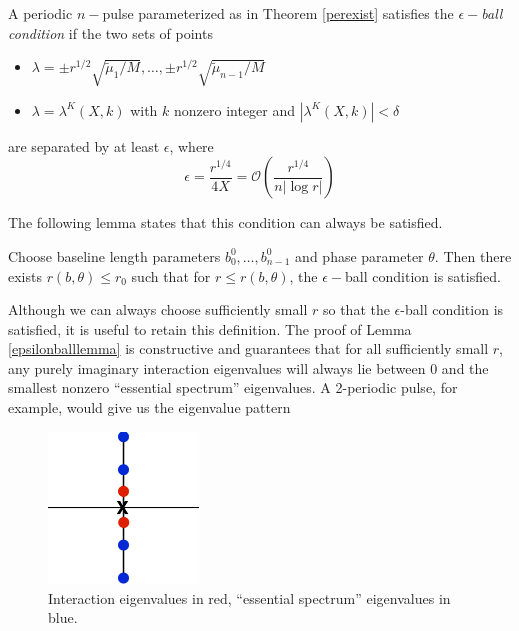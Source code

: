 \documentclass[thesis.tex]{subfiles}
\begin{document}
\begin{definition}\label{epsilonballs}
A periodic $n-$pulse parameterized as in Theorem \ref{perexist} satisfies the \emph{$\epsilon-$ball condition} if the two sets of points 
\begin{itemize}
\item $\lambda = \pm r^{1/2} \sqrt{\tilde{\mu}_1/M}, \dots, \pm r^{1/2} \sqrt{\tilde{\mu}_{n-1}/M}$
\item $\lambda = \lambda^K(X,k)$ with $k$ nonzero integer and $|\lambda^K(X,k)| < \delta$
\end{itemize}
are separated by at least $\epsilon$, where
\[
\epsilon = \frac{r^{1/4}}{4X} = \mathcal{O} \left( \frac{r^{1/4}}{n |\log r| } \right)
\]
\end{definition}

The following lemma states that this condition can always be satisfied.

\begin{lemma}\label{epsilonballlemma}
Choose baseline length parameters $b_0^0, \dots, b_{n-1}^0$ and phase parameter $\theta$. Then there exists $r(b, \theta) \leq r_0$ such that for $r \leq r(b, \theta)$, the $\epsilon-$ball condition is satisfied.
\end{lemma} 

Although we can always choose sufficiently small $r$ so that the $\epsilon$-ball condition is satisfied, it is useful to retain this definition. The proof of Lemma \ref{epsilonballlemma} is constructive and guarantees that for all sufficiently small $r$, any purely imaginary interaction eigenvalues will always lie between 0 and the smallest nonzero ``essential spectrum'' eigenvalues. A 2-periodic pulse, for example, would give us the eigenvalue pattern

\begin{figure}[H]
\begin{center}
\includegraphics[width=4cm]{periodic/2pulseess}
\end{center}
\caption{Interaction eigenvalues in red, ``essential spectrum'' eigenvalues in blue.}
\end{figure}
\end{document}
